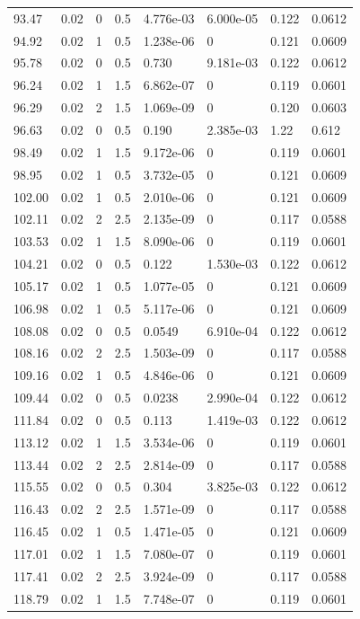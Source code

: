\documentclass[preview]{standalone}
\begin{document}
{{{\begin{tabular}{L{1.2cm}C{1.2cm} C{0.3cm}C{0.5cm} C{1.4cm}C{1.4cm} C{1.4cm}C{1.4cm}}
  93.47  &  0.02  & 0     & 0.5 &  4.776e-03  & 6.000e-05  & 0.122 &  0.0612   \\ 
  94.92  &  0.02  & 1     & 0.5 &  1.238e-06  & 0  & 0.121 &  0.0609   \\ 
  95.78  &  0.02  & 0     & 0.5 &  0.730  & 9.181e-03  & 0.122 &  0.0612   \\ 
  96.24  &  0.02  & 1     & 1.5 &  6.862e-07  & 0  & 0.119 &  0.0601   \\ 
  96.29  &  0.02  & 2     & 1.5 &  1.069e-09  & 0  & 0.120 &  0.0603   \\ 
  96.63  &  0.02  & 0     & 0.5 &  0.190  & 2.385e-03  & 1.22 &  0.612   \\ 
  98.49  &  0.02  & 1     & 1.5 &  9.172e-06  & 0  & 0.119 &  0.0601   \\ 
  98.95  &  0.02  & 1     & 0.5 &  3.732e-05  & 0  & 0.121 &  0.0609   \\ 
  102.00  &  0.02  & 1     & 0.5 &  2.010e-06  & 0  & 0.121 &  0.0609   \\ 
  102.11  &  0.02  & 2     & 2.5 &  2.135e-09  & 0  & 0.117 &  0.0588   \\ 
  103.53  &  0.02  & 1     & 1.5 &  8.090e-06  & 0  & 0.119 &  0.0601   \\ 
  104.21  &  0.02  & 0     & 0.5 &  0.122  & 1.530e-03  & 0.122 &  0.0612   \\ 
  105.17  &  0.02  & 1     & 0.5 &  1.077e-05  & 0  & 0.121 &  0.0609   \\ 
  106.98  &  0.02  & 1     & 0.5 &  5.117e-06  & 0  & 0.121 &  0.0609   \\ 
  108.08  &  0.02  & 0     & 0.5 &  0.0549  & 6.910e-04  & 0.122 &  0.0612   \\ 
  108.16  &  0.02  & 2     & 2.5 &  1.503e-09  & 0  & 0.117 &  0.0588   \\ 
  109.16  &  0.02  & 1     & 0.5 &  4.846e-06  & 0  & 0.121 &  0.0609   \\ 
  109.44  &  0.02  & 0     & 0.5 &  0.0238  & 2.990e-04  & 0.122 &  0.0612   \\ 
  111.84  &  0.02  & 0     & 0.5 &  0.113  & 1.419e-03  & 0.122 &  0.0612   \\ 
  113.12  &  0.02  & 1     & 1.5 &  3.534e-06  & 0  & 0.119 &  0.0601   \\ 
  113.44  &  0.02  & 2     & 2.5 &  2.814e-09  & 0  & 0.117 &  0.0588   \\ 
  115.55  &  0.02  & 0     & 0.5 &  0.304  & 3.825e-03  & 0.122 &  0.0612   \\ 
  116.43  &  0.02  & 2     & 2.5 &  1.571e-09  & 0  & 0.117 &  0.0588   \\ 
  116.45  &  0.02  & 1     & 0.5 &  1.471e-05  & 0  & 0.121 &  0.0609   \\ 
  117.01  &  0.02  & 1     & 1.5 &  7.080e-07  & 0  & 0.119 &  0.0601   \\ 
  117.41  &  0.02  & 2     & 2.5 &  3.924e-09  & 0  & 0.117 &  0.0588   \\ 
  118.79  &  0.02  & 1     & 1.5 &  7.748e-07  & 0  & 0.119 &  0.0601   \\ 
\hline 
\end{tabular} 

}}}
\end{document}
